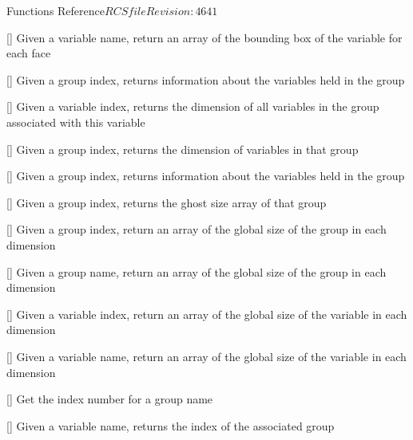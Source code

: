\begin{cactuspart}{ Functions Reference}{$RCSfile$}{$Revision: 4641 $}
\begin{Lentry}
\item[\code{CCTK\_GroupbboxVN}] [\pageref{CCTK-GroupbboxVN}]
  Given a variable name, return an array of the bounding box
  of the variable for each face

\item[\code{CCTK\_GroupData}] [\pageref{CCTK-GroupData}]
  Given a group index, returns information about the variables
  held in the group

\item[\code{CCTK\_GroupDimFromVarI}] [\pageref{CCTK-GroupDimFromVarI}]
  Given a variable index, returns the dimension of all variables in the group
  associated with this variable

\item[\code{CCTK\_GroupDimI}] [\pageref{CCTK-GroupDimI}]
  Given a group index, returns the dimension of variables in that group

\item[\code{CCTK\_GroupDynamicData}] [\pageref{CCTK-GroupDynamicData}]
  Given a group index, returns information about the variables
  held in the group

\item[\code{CCTK\_GroupGhostsizesI}] [\pageref{CCTK-GroupGhostsizesI}]
  Given a group index, returns the ghost size array of that group

\item[\code{CCTK\_GroupgshGI}] [\pageref{CCTK-GroupgshGI}]
  Given a group index, return an array of the global size
  of the group in each dimension

\item[\code{CCTK\_GroupgshGN}] [\pageref{CCTK-GroupgshGN}]
  Given a group name, return an array of the global size
  of the group in each dimension

\item[\code{CCTK\_GroupgshVI}] [\pageref{CCTK-GroupgshVI}]
  Given a variable index, return an array of the global size
  of the variable in each dimension

\item[\code{CCTK\_GroupgshVN}] [\pageref{CCTK-GroupgshVN}]
  Given a variable name, return an array of the global size
  of the variable in each dimension

\item[\code{CCTK\_GroupIndex}] [\pageref{CCTK-GroupIndex}]
  Get the index number for a group name

\item[\code{CCTK\_GroupIndexFromVar}] [\pageref{CCTK-GroupIndexFromVar}]
  Given a variable name, returns the index of the associated group


\end{Lentry}
\end{cactuspart}
